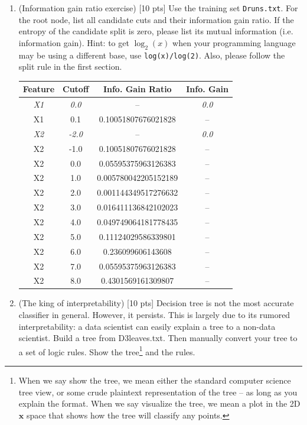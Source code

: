 \documentclass[a4paper]{article}
\theoremstyle{definition}
\def\x{\mathbf x}
\newenvironment{soln}{
    \leavevmode\color{blue}\ignorespaces
}{}
\begin{document}
\begin{enumerate}
\item (Information gain ratio exercise)  [10 pts] Use the training set \texttt{Druns.txt}.  For the root node, list all candidate cuts and their information gain ratio. If the entropy of the candidate split is zero, please list its mutual information (i.e. information gain). Hint: to get $\log_2(x)$ when your programming language may be using a different base, use \verb|log(x)/log(2)|. Also, please follow the split rule in the first section. \\
\begin{soln}
    \begin{tabular}{|c|c|c|c|}
        \hline
        \textbf{Feature} & \textbf{Cutoff} & \textbf{Info. Gain Ratio} & \textbf{Info. Gain} \\
        \hline
        \textit{X1} & \textit{0.0} & -- & \textit{0.0} \\
        X1 & 0.1 & 0.10051807676021828 & -- \\
        \hline
        \textit{X2} & \textit{-2.0} & -- & \textit{0.0} \\
        X2 & -1.0 & 0.10051807676021828 & -- \\
        X2 & 0.0 & 0.05595375963126383 & -- \\
        X2 & 1.0 & 0.005780042205152189 & -- \\
        X2 & 2.0 & 0.001144349517276632 & -- \\
        X2 & 3.0 & 0.016411136842102023 & -- \\
        X2 & 4.0 & 0.049749064181778435 & -- \\
        X2 & 5.0 & 0.11124029586339801 & -- \\
        X2 & 6.0 & 0.236099606143608 & -- \\
        X2 & 7.0 & 0.05595375963126383 & -- \\
        X2 & 8.0 & 0.4301569161309807 & -- \\
        \hline
    \end{tabular}
\end{soln}

\item (The king of interpretability)  [10 pts] Decision tree is not the most accurate classifier in general.  However, it persists.  This is largely due to its rumored interpretability: a data scientist can easily explain a tree to a non-data scientist.  Build a tree from D3leaves.txt.  Then manually convert your tree to a set of logic rules.  Show the tree\footnote{When we say show the tree, we mean either the standard computer science tree view, or some crude plaintext representation of the tree -- as long as you explain the format.  When we say visualize the tree, we mean a plot in the 2D $\x$ space that shows how the tree will classify any points.} and the rules. \\


\end{enumerate}
\end{document}
